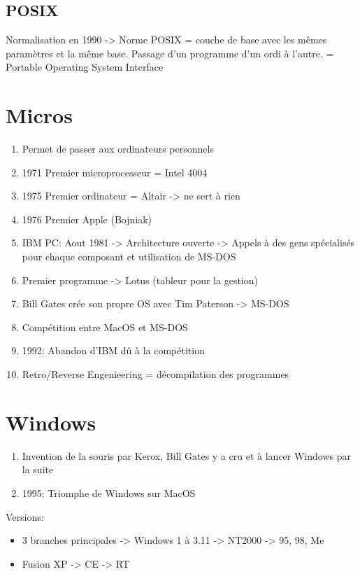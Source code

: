 \subsection{POSIX}
Normalisation en 1990 -> Norme POSIX = couche de base avec les mêmes paramètres et la même base.
Passage d'un programme d'un ordi à l'autre. = Portable Operating System Interface

\section{Micros}
\begin{enumerate}
\item Permet de passer aux ordinateurs personnels
\item 1971 Premier microprocesseur = Intel 4004
\item 1975 Premier ordinateur = Altair -> ne sert à rien
\item 1976 Premier Apple (Bojniak)
\item IBM PC: Aout 1981 -> Architecture ouverte -> Appels à des gens spécialisés pour chaque composant et utilisation de MS-DOS
\item Premier programme -> Lotus (tableur pour la gestion)
\item Bill Gates crée son propre OS avec Tim Paterson -> MS-DOS
\item Compétition entre MacOS et MS-DOS
\item 1992: Abandon d'IBM dû à la compétition
\item Retro/Reverse Engenieering = décompilation des programmes
\end{enumerate}

\section{Windows}
\begin{enumerate}
\item Invention de la souris par Kerox, Bill Gates y a cru et à lancer Windows par la suite
\item 1995: Triomphe de Windows sur MacOS
\end{enumerate}
Versions: 
\begin{itemize}
\item 3 branches principales -> Windows 1 à 3.11 -> NT2000 -> 95, 98, Me
\item Fusion XP -> CE -> RT
\end{itemize}
